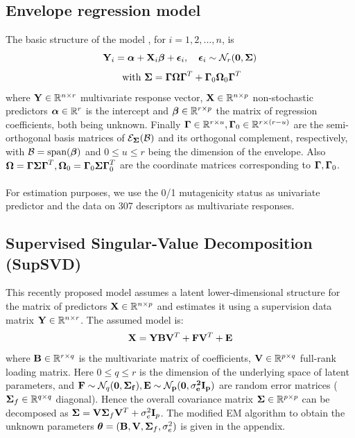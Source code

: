 \documentclass[11pt]{llncs}
\begin{document}
\subsection{Envelope regression model}
The basic structure of the model \cite{cook}, for $i = 1,2,...,n $, is
$$ {\mathbf{Y}}_i = {\boldsymbol{\alpha}} + {\mathbf{X}}_i{\boldsymbol{\beta}} + {\boldsymbol{\epsilon}}_i,\quad {\boldsymbol{\epsilon}}_i\sim \mathcal N_r({\mathbf{0}},{\boldsymbol{\Sigma}})$$
$$\mbox{ with }{\boldsymbol{\Sigma}} = {\boldsymbol{\Gamma}}{\boldsymbol{\Omega}}{\boldsymbol{\Gamma}}^T + {\boldsymbol{\Gamma}}_0{\boldsymbol{\Omega}}_0{\boldsymbol{\Gamma}}^T$$
where ${\mathbf{Y}}\in{\mathbb{R}}^{n\times r}$ multivariate response vector, ${\mathbf{X}}\in{\mathbb{R}}^{n\times p}$ non-stochastic predictors ${\boldsymbol{\alpha}}\in{\mathbb{R}}^r$ is the intercept and ${\boldsymbol{\beta}}\in{\mathbb{R}}^{r\times p}$ the matrix of regression coefficients, both being unknown. Finally ${\boldsymbol{\Gamma}}\in{\mathbb{R}}^{r\times u},{\boldsymbol{\Gamma}}_0\in{\mathbb{R}}^{r\times (r-u)}$ are the semi-orthogonal basis matrices of ${\cal{E}}_{\boldsymbol{\Sigma}}({\cal{B}})$ and its orthogonal complement, respectively, with ${\cal{B}} = \mbox{span}({\boldsymbol{\beta}})$ and $0\leq u\leq r$ being the dimension of the envelope. Also ${\boldsymbol{\Omega}} = {\boldsymbol{\Gamma}}{\boldsymbol{\Sigma}}{\boldsymbol{\Gamma}}^T, {\boldsymbol{\Omega}}_0 = {\boldsymbol{\Gamma}}_0{\boldsymbol{\Sigma}}{\boldsymbol{\Gamma}}_0^T$ are the coordinate matrices corresponding to ${\boldsymbol{\Gamma}}, {\boldsymbol{\Gamma}}_0$.
\paragraph{}For estimation purposes, we use the 0/1 mutagenicity status as univariate predictor and the data on 307 descriptors as multivariate responses.

\subsection{Supervised Singular-Value Decomposition (SupSVD)}
This recently proposed model \cite{supsvd} assumes a latent lower-dimensional structure for the matrix of predictors ${\mathbf{X}}\in{\mathbb{R}}^{n\times p}$ and estimates it using a supervision data matrix ${\mathbf{Y}}\in{\mathbb{R}}^{n\times r}$. The assumed model is:
$$ {\mathbf{X}} = {\mathbf{Y}}{\mathbf{B}}{\mathbf{V}}^T + {\mathbf{F}}{\mathbf{V}}^T + {\mathbf{E}} $$
where ${\mathbf{B}}\in\mathbb{R}^{r\times q}$ is the multivariate matrix of coefficients, ${\mathbf{V}}\in\mathbb{R}^{p\times q}$ full-rank loading matrix. Here $0\leq q\leq r$ is the dimension of the underlying space of latent parameters, and ${\mathbf{F}}\sim\mathcal{N}_q(\bf0,{\boldsymbol{\Sigma}}_f), {\mathbf{E}}\sim\mathcal{N}_p(\bf0,\sigma_e^2{\mathbf{I}}_p)$ are random error matrices (${\boldsymbol{\Sigma}}_f\in\mathbb{R}^{q\times q}$ diagonal). Hence the overall covariance matrix ${\boldsymbol{\Sigma}}\in\mathbb{R}^{p\times p}$ can be decomposed as ${\boldsymbol{\Sigma}} = {\mathbf{V}}{\boldsymbol{\Sigma}}_f{\mathbf{V}}^T + \sigma_e^2{\mathbf{I}}_p$. The modified EM algorithm to obtain the unknown parameters ${\boldsymbol{\theta}}=({\mathbf{B}},{\mathbf{V}},{\boldsymbol{\Sigma}}_f,\sigma_e^2)$ is given in the appendix.
\end{document}
